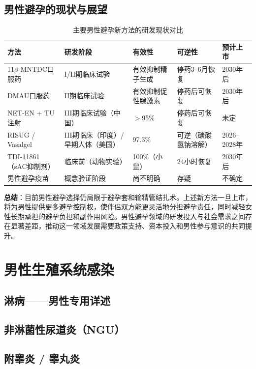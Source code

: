 \subsection{男性避孕的现状与展望}

\begin{table}[htbp]
\centering
\caption{主要男性避孕新方法的研发现状对比}
\label{tab:male_contraception_new}
\begin{tabularx}{\textwidth}{@{}lXXXX@{}}
    \toprule
    \textbf{方法} & \textbf{研发阶段} & \textbf{有效性} & \textbf{可逆性} & \textbf{预计上市} \\
    \midrule
    11$\beta$-MNTDC口服药 & I/II期临床试验 & 有效抑制精子生成 & 停药3--6月恢复 & 2030年后 \\
    DMAU口服药 & II期临床试验 & 有效抑制促性腺激素 & 停药后可恢复 & 2030年后 \\
    NET-EN + TU注射 & III期临床试验（中国） & $>$95\% & 停药后可恢复 & 未定 \\
    RISUG / Vasalgel & III期临床（印度）/ 早期人体（美国） & 97.3\% & 可逆（碳酸氢钠溶解） & 2026--2028年 \\
    TDI-11861（sAC抑制剂） & 临床前（动物实验） & 100\%（小鼠） & 24小时恢复 & 2030年后 \\
    男性避孕疫苗 & 概念验证阶段 & 尚不明确 & 存疑 & 不确定 \\
    \bottomrule
\end{tabularx}
\end{table}

\noindent\textbf{总结}：目前男性避孕选择仍局限于避孕套和输精管结扎术。上述新方法一旦上市，将为男性提供更多避孕控制权，使伴侣双方能更灵活地分担避孕责任，同时减轻女性长期承担的避孕负担和副作用风险。男性避孕领域的研发投入与社会需求之间存在显著差距，推动这一领域发展需要政策支持、资本投入和男性参与意识的共同提升。

\section{男性生殖系统感染}
\subsection{淋病——男性专用详述}
\subsection{非淋菌性尿道炎（NGU）}
\subsection{附睾炎 / 睾丸炎}
